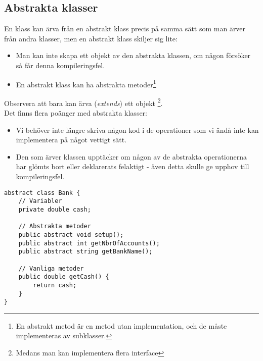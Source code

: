 \documentclass[11pt]{article}
\begin{document}
\subsection{Abstrakta klasser}
En klass kan ärva från en abstrakt klass precis på samma sätt som man ärver från andra klasser, men en abstrakt klass skiljer sig lite: 
\begin{itemize}
\item{Man kan inte skapa ett objekt av den abstrakta klassen, om någon försöker så får denna kompileringsfel.}
\item{En abstrakt klass kan ha abstrakta metoder\footnote{En abstrakt metod är en metod utan implementation, och de måste implementeras av subklasser.}}
\end{itemize}
Observera att bara kan ärva (\emph{extends}) ett objekt \footnote{Medans man kan implementera flera interface}. \\
Det finns flera poänger med abstrakta klasser:
\begin{itemize}
\item{ Vi behöver inte längre skriva någon kod i de operationer som vi ändå inte kan implementera på något vettigt sätt. }
\item{ Den som ärver klassen upptäcker om någon av de abstrakta operationerna har glömts bort eller deklarerats felaktigt - även detta skulle ge upphov till kompileringsfel. }
\end{itemize}
\begin{lstlisting}
abstract class Bank {
	// Variabler
	private double cash;
	
	// Abstrakta metoder
	public abstract void setup();
	public abstract int getNbrOfAccounts();
	public abstract string getBankName();
	
	// Vanliga metoder
	public double getCash() {
		return cash;
	}
}
\end{lstlisting}
\end{document}

